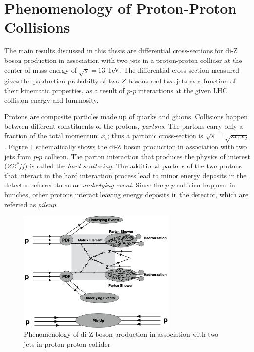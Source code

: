 \section{Phenomenology of Proton-Proton Collisions }    
\label{sec:Pheno}

The main results discussed in this thesis are differential cross-sections for di-Z boson production in association with two jets in a proton-proton collider at the center of mass energy of $\sqrt{s}=13$ TeV. The differential cross-section measured gives the production probabilty of two $Z$ bosons and two jets as a function of their kinematic properties, as a result of $p$-$p$ interactions at the given LHC collision energy and luminosity.

Protons are composite particles made up of quarks and gluons. Collisions happen between different constituents of the protons, \textit{partons}. The partons carry only a fraction of the total momentum $x_{i}$; thus a partonic cross-section is $\sqrt{\hat{s}} = \sqrt{sx_1x_2}$. Figure \ref{fig:ColliderPheno} schematically shows the di-Z boson production in association with two jets from $p$-$p$ collison. The parton interaction that produces the physics of interest ($ZZ^*jj$) is called the \textit{hard scattering}. The additional partons of the two protons that interact in the hard interaction process lead to minor energy deposits in the detector referred to as an \textit{underlying event}. Since the $p$-$p$ collision happens in bunches, other protons interact leaving energy deposits in the detector, which are referred as \textit{pileup}.

\begin{figure}[!htb]
\centering
    \includegraphics[width=0.7\textwidth] {figures/Theory/ColliderPheno.pdf}\hspace{1cm}
    \caption{Phenomenology of di-Z boson production in association with two jets in proton-proton collider}
\label{fig:ColliderPheno}
\end{figure}

